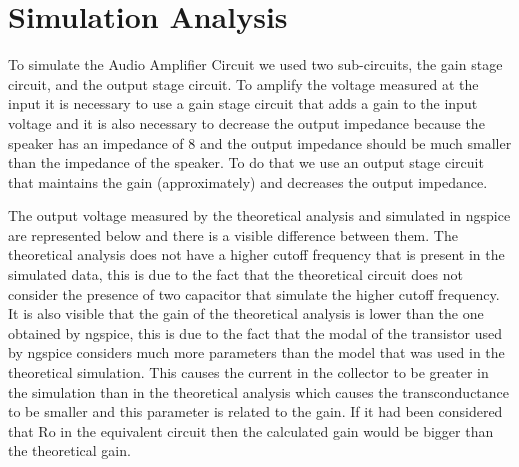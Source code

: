 \section{Simulation Analysis}
\label{sec:simulation}

To simulate the Audio Amplifier Circuit we used two sub-circuits, the gain stage circuit, and the output stage circuit.
To amplify the voltage measured at the input it is necessary to use a gain stage circuit that adds a gain to the input voltage and it is also necessary to decrease the output impedance because the speaker has an impedance of 8 \omega and the output impedance should be much smaller than the impedance of the speaker. To do that we use an output stage circuit that maintains the gain (approximately) and decreases the output impedance.

The output voltage measured by the theoretical analysis and simulated in ngspice are represented below and there is a visible difference between them. The theoretical analysis does not have a higher cutoff frequency that is present in the simulated data, this is due to the fact that the theoretical circuit does not consider the presence of two capacitor that simulate the higher cutoff frequency. It is also visible that the gain of the theoretical analysis is lower than the one obtained by ngspice, this is due to the fact that the modal of the transistor used by ngspice considers much more parameters than the model that was used in the theoretical simulation. This causes the current in the collector to be greater in the simulation than in the theoretical analysis which causes the transconductance to be smaller and this parameter is related to the gain.
If it had been considered that Ro in the equivalent circuit then the calculated gain would be bigger than the theoretical gain.
